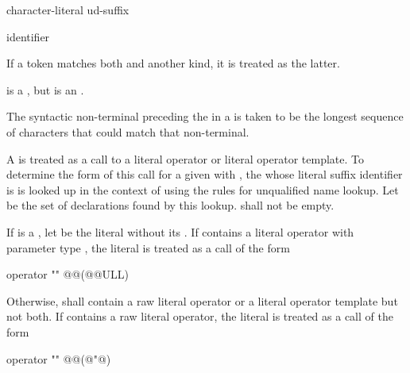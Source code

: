 \begin{bnf}
\br
    character-literal ud-suffix
\end{bnf}

\begin{bnf}
\br
    identifier
\end{bnf}

\pnum
If a token matches both  and another  kind, it
is treated as the latter. \begin{example} 
is a , but  is an
. \end{example}
The syntactic non-terminal preceding the  in a
 is taken to be the longest sequence of
characters that could match that non-terminal.

\pnum
A  is treated as a call to a literal operator or
literal operator template. To determine the form of this call for a
given   with  ,
the  whose literal suffix identifier is  is
looked up in the context of  using the rules for unqualified name
lookup. Let  be the set of declarations found by
this lookup.  shall not be empty.

\pnum
If  is a , let  be the literal
without its . If  contains a literal operator with
parameter type , the literal  is treated as a call of
the form

\begin{codeblock}
operator "" @@(@@ULL)
\end{codeblock}

Otherwise,  shall contain a raw literal operator or a literal operator
template but not both. If  contains a raw literal operator,
the literal  is treated as a call of the form

\begin{codeblock}
operator "" @@(@"@)
\end{codeblock}

